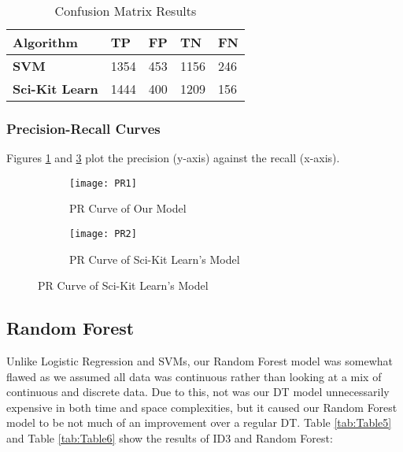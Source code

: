 \begin{table}[H]
    \centering
    \begin{tabular}{|l|l|l|l|l|}
        \hline
        \textbf{Algorithm}     & \textbf{TP} & \textbf{FP} & \textbf{TN} & \textbf{FN} \\
        \hline
        \textbf{SVM}           & 1354        & 453         & 1156        & 246         \\
        \textbf{Sci-Kit Learn} & 1444        & 400         & 1209        & 156         \\
        \hline
    \end{tabular}
    \caption{Confusion Matrix Results}
    \label{tab:Table4}
\end{table}

\subsubsection{Precision-Recall Curves}
\label{sec:evaluation:SVMs:Precision-Recall Curves}

Figures \ref{fig:Figure5} and \ref{fig:Figure6} plot the precision (y-axis) against the recall (x-axis).

\begin{figure}[ht]
    \centering
    \begin{subfigure}[t]{.45\textwidth}
        \centering\texttt{[image: PR1]}
        \caption{PR Curve of Our Model}
        \label{fig:Figure5}
    \end{subfigure}
    \begin{subfigure}[t]{.45\textwidth}
        \centering\texttt{[image: PR2]}
        \caption{PR Curve of Sci-Kit Learn's Model}
        \label{fig:Figure6}
    \end{subfigure}
\end{figure}

\subsection{Random Forest}
\label{sec:evaluation:Random Forest}

Unlike Logistic Regression and SVMs, our Random Forest model was somewhat flawed as we assumed all data was continuous rather than looking at a mix of continuous and discrete data. Due to this, not was our DT model unnecessarily expensive in both time and space complexities, but it caused our Random Forest model to be not much of an improvement over a regular DT. Table \ref{tab:Table5} and Table \ref{tab:Table6} show the results of ID3 and Random Forest:

